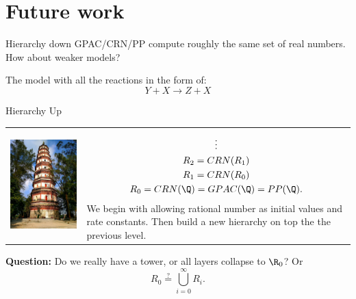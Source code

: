 \documentclass[aspectratio=169]{beamer}
\begin{document}
\section{Future work}
\begin{frame}{Hierarchy down}
    GPAC/CRN/PP compute roughly the same set of real numbers. How about weaker models?

    \begin{example}
    The model with all the reactions in the form of:\\
    \[
         Y + X \to Z + X
    \]
    \end{example}
\end{frame}
\begin{frame}[Clean]{Hierarchy Up}
\begin{tabular}[t]{ll}
  \begin{minipage}{0.5\linewidth}
\centering
\includegraphics[scale=0.25]{dongta}
\end{minipage} &
\begin{minipage}{0.5\linewidth}
\centering
\begin{gather*}
  \vdots \\
  R_2=CRN(R_1)\\
  R_1=CRN(R_0)\\
  R_0= CRN(\Q) =GPAC(\Q) = PP(\Q).
\end{gather*}
We begin with allowing rational number as initial values and rate constants. Then build a new hierarchy on top the the previous level. \pause
\end{minipage}
\end{tabular}

\textbf{Question:} Do we really have a tower, or all layers collapse to $\R_0$? Or
\[
    R_0 \stackrel{?}{=} \bigcup_{i=0}^{\infty}R_i.
\]
\end{frame}
\end{document}
